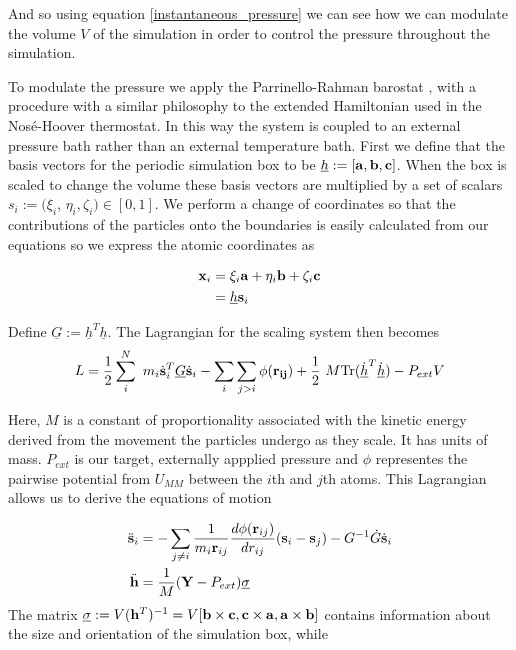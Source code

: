 And so using equation \ref{instantaneous_pressure} we can see how we can modulate the volume $V$ of the simulation in order to control the pressure throughout the simulation.

To modulate the pressure we apply the Parrinello-Rahman barostat \cite{parrinello1980}\cite{parrinello1981a}, with a procedure with a similar philosophy to the extended Hamiltonian used in the Nos\'e-Hoover thermostat. In this way the system is coupled to an external pressure bath rather than an external temperature bath. First we define that the basis vectors for the periodic simulation box to be $\underline{h}:= [\bold{a}, \bold{b} ,\bold{c}]$. When the box is scaled to change the volume these basis vectors are multiplied by a set of scalars $s_i := (\xi_i$, $\eta_i, \zeta_i ) \in [0,1]$. We perform a change of coordinates so that the contributions of the particles onto the boundaries is easily calculated from our equations so we express the atomic coordinates as

\begin{equation}
\begin{aligned}
	\bold{x}_i &= \xi_i \bold{a} +\eta_i \bold{b} +\zeta_i \bold{c}  \\
	           &= \underline{h}\bold{s}_i
\end{aligned}
\end{equation}

Define $\underline{G} := \underline{h}^T\underline{h}$. The Lagrangian for the scaling system then becomes
\begin{equation}
\begin{aligned}
	L = \frac{1}{2} \sum_i^N \  m_i \dot{\bold{s}}_i^T\underline{G}\dot{\bold{s}}_i - \sum_i \sum_{j > i } \phi (\bold{r_{ij}}) + \frac{1}{2} \ M \text{Tr}(\dot{\underline{h}}^T\dot{\underline{h}})   - {P}_{ext} V
\end{aligned}
\end{equation}

Here, $M$ is a constant of proportionality associated with the kinetic energy derived from the movement the particles undergo as they scale. It has units of mass. $P_{ext}$ is our target, externally appplied pressure and $\phi$ representes the pairwise potential from $U_{MM}$ between the $i$th and $j$th atoms. This Lagrangian allows us to derive the equations of motion  

\begin{equation}
\begin{aligned}
	\ddot{\bold{s}}_i &= -\sum_{j\neq i}   \frac{1}{m_i\bold{r}_{ij} }\frac{d\phi(\bold{r}_{ij})}{d r_{ij}}  (\bold{s}_i - \bold{s}_j) - G^{-1}\dot{G} \dot{\bold{s}}_i \\
	\ddot{\bold{h}} &= \frac{1}{M} (\bold{Y} -P_{ext}) \underline{\sigma}
\end{aligned}
\end{equation}
The matrix $\underline{\sigma} := V (\bold{h}^T)^{-1} = V  [\bold{b} \times \bold{c}, \bold{c} \times \bold{a}, \bold{a} \times \bold{b}] $  contains information about the size and orientation of the simulation box, while 


